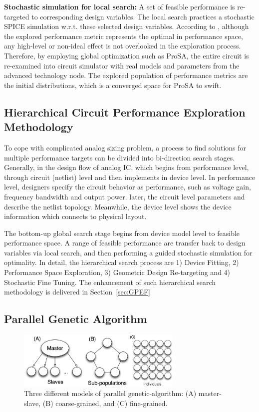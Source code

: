       \begin{defi}
        {\bf Stochastic simulation for local search:} A set of feasible performance is re-targeted to corresponding design variables. The local search practices a stochastic SPICE simulation w.r.t. these selected design variables. According to \cite{PerfMap_ISQED2011}, although the explored performance metric represents the optimal in performance space, any high-level or non-ideal effect is not overlooked in the exploration process. Therefore, by employing global optimization such as ProSA, the entire circuit is re-examined into circuit simulator with real models and parameters from the advanced technology node. The explored population of performance metrics are the initial distributions, which is a converged space for ProSA to swift.
      \end{defi}
    \subsection{Hierarchical Circuit Performance Exploration Methodology\cite{PerfMap_ISQED2011}}
      To cope with complicated analog sizing problem, a process to find solutions for multiple performance targets can be divided into bi-direction search stages. Generally, in the design flow of analog IC, which begins from performance level, through circuit (netlist) level and then implements in device level. In performance level, designers specify the circuit behavior as performance, such as voltage gain, frequency bandwidth and output power. later, the circuit level parameters and describe the netlist topology. Meanwhile, the device level shows the device information which connects to physical layout. 

      The bottom-up global search stage begins from device model level to feasible performance space. A range of feasible performance are transfer back to design variables via local search, and then performing a guided stochastic simulation for optimality. In detail, the hierarchical search process are 1) Device Fitting, 2) Performance Space Exploration, 3) Geometric Design Re-targeting and 4) Stochastic Fine Tuning. The enhancement of such hierarchical search methodology is delivered in Section~\ref{sec:GPEF}
    \subsection{Parallel Genetic Algorithm}\label{subsec:PGAIntro}
      \begin{figure}[t]
        \centering
        \centerline{
          \includegraphics[width=0.7\textwidth]{Fig/Chapter2/PGA_reduced.eps}
        }
        \caption{Three different models of parallel genetic-algorithm: (A) master-slave, (B) coarse-grained, and (C) fine-grained.}
        \label{fig:PGA}
        \end{figure}

